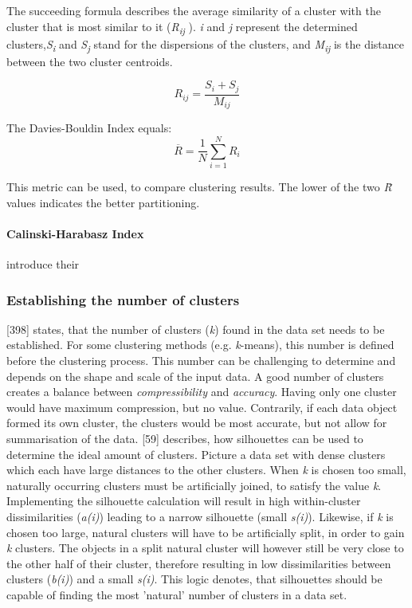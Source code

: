 The succeeding formula describes the average similarity of a cluster with the cluster that is most similar to it (\textit{R\textsubscript{ij}} ).
\textit{i} and \textit{j} represent the determined clusters,\textit{S\textsubscript{i}} and \textit{S\textsubscript{j}} stand for the dispersions of the clusters, and \textit{M\textsubscript{ij}} is the distance between the two cluster centroids. 

\[
  R_{ij} = \frac{S_i + S_j}{M_{ij}}  
\]

The Davies-Bouldin Index equals:
\[
\overline{R} = \frac{1}{N}\sum_{i=1}^{N}R_i
\]

This metric can be used, to compare clustering results. The lower of the two \textit{\=R} values indicates the better partitioning.

\paragraph{Calinski-Harabasz Index}
\textcite{calinskiHarabasz} introduce their



\subsubsection{Establishing the number of clusters}
 \textcite{han2011data}[398] states, that the number of clusters (\textit{k}) found in the data set needs to be established. For some clustering methods (e.g. \textit{k}-means), this number is defined before the clustering process. This number can be challenging to determine and depends on the shape and scale of the input data. A good number of clusters creates a balance between \textit{compressibility} and \textit{accuracy}. Having only one cluster would have maximum compression, but no value. Contrarily, if each data object formed its own cluster, the clusters would be most accurate, but not allow for summarisation of the data. 
\textcite{rousseeuw1987silhouettes}[59] describes, how silhouettes can be used to determine the ideal amount of clusters. Picture a data set with dense clusters which each have large distances to the other clusters. When \textit{k} is chosen too small, naturally occurring clusters must be artificially joined, to satisfy the value \textit{k}. Implementing the silhouette calculation will result in high within-cluster dissimilarities (\textit{a(i)}) leading to a narrow silhouette (small \textit{s(i)}). Likewise, if \textit{k} is chosen too large, natural clusters will have to be artificially split, in order to gain \textit{k} clusters. The objects in a split natural cluster will however still be very close to the other half of their cluster, therefore resulting in low dissimilarities between clusters (\textit{b(i)}) and a small \textit{s(i)}.
This logic denotes, that silhouettes should be capable of finding the most 'natural' number of clusters in a data set.


  
